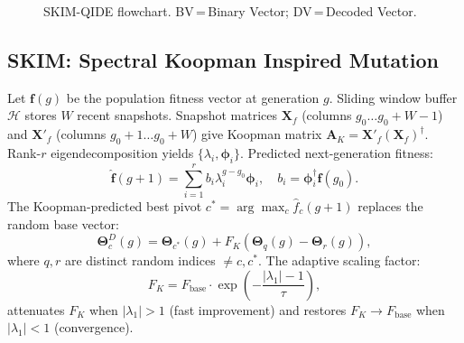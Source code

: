 \documentclass[10pt,twocolumn]{article}
\begin{document}
\begin{figure}[t]
\caption{SKIM-QIDE flowchart. BV\,=\,Binary Vector; DV\,=\,Decoded Vector.}
\label{fig:flowchart}
\end{figure}

\subsection{SKIM: Spectral Koopman Inspired Mutation}
Let $\mathbf{f}(g)$ be the population fitness vector at generation $g$. Sliding window buffer $\mathcal{H}$ stores $W$ recent snapshots. Snapshot matrices $\mathbf{X}_f$ (columns $g_0\ldots g_0{+}W{-}1$) and $\mathbf{X}'_f$ (columns $g_0{+}1\ldots g_0{+}W$) give Koopman matrix $\mathbf{A}_K=\mathbf{X}'_f(\mathbf{X}_f)^\dagger$. Rank-$r$ eigendecomposition yields $\{\lambda_i,\boldsymbol{\phi}_i\}$. Predicted next-generation fitness:
\begin{equation}
\hat{\mathbf{f}}(g{+}1)=\sum_{i=1}^{r}b_i\lambda_i^{g-g_0}\boldsymbol{\phi}_i,\quad b_i=\boldsymbol{\phi}_i^\dagger\mathbf{f}(g_0).
\label{eq:pred}
\end{equation}
The Koopman-predicted best pivot $c^*=\arg\max_c\hat{f}_c(g+1)$ replaces the random base vector:
\begin{equation}
\boldsymbol{\Theta}^D_c(g)=\boldsymbol{\Theta}_{c^*}(g)+F_K(\boldsymbol{\Theta}_q(g)-\boldsymbol{\Theta}_r(g)),
\label{eq:skim}
\end{equation}
where $q,r$ are distinct random indices $\ne c,c^*$. The adaptive scaling factor:
\begin{equation}
F_K=F_{\mathrm{base}}\cdot\exp\!\left(-\frac{|\lambda_1|-1}{\tau}\right),
\label{eq:FK}
\end{equation}
attenuates $F_K$ when $|\lambda_1|>1$ (fast improvement) and restores $F_K\to F_{\mathrm{base}}$ when $|\lambda_1|<1$ (convergence).
\end{document}
